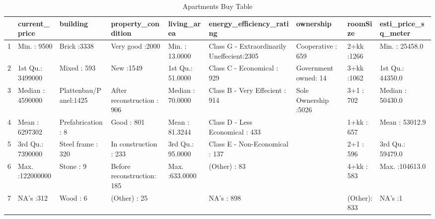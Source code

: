 \begin{table}[ht]
\centering
\begin{tabular}{rllllllll}
  \hline
 & current\_price &             building &             property\_condition &  living\_area &                          energy\_efficiency\_rating &            ownership &    roomSize & esti\_price\_sq\_meter \\ 
  \hline
1 & Min.   :     9500   & Brick           :3338   & Very good            :2000   & Min.   : 13.0000   & Class G - Extraordinarily Uneffecient:2305   & Cooperative     : 659   & 2+kk   :1266   & Min.   : 25458.0   \\ 
  2 & 1st Qu.:  3499000   & Mixed           : 593   & New                  :1549   & 1st Qu.: 51.0000   & Class C - Economical                 : 929   & Government owned:  14   & 3+kk   :1062   & 1st Qu.: 44350.0   \\ 
  3 & Median :  4590000   & Plattenbau/Panel:1425   & After reconstruction : 906   & Median : 70.0000   & Class B - Very Effecient             : 914   & Sole Ownership  :5026   & 3+1    : 702   & Median : 50430.0   \\ 
  4 & Mean   :  6297302   & Prefabrication  :   8   & Good                 : 801   & Mean   : 81.3244   & Class D - Less Economical            : 433   &  & 1+kk   : 657   & Mean   : 53012.9   \\ 
  5 & 3rd Qu.:  7390000   & Steel frame     : 320   & In construction      : 233   & 3rd Qu.: 95.0000   & Class E - Non-Economical             : 137   &  & 2+1    : 596   & 3rd Qu.: 59479.0   \\ 
  6 & Max.   :122000000   & Stone           :   9   & Before reconstruction: 185   & Max.   :633.0000   & (Other)                              :  83   &  & 4+kk   : 583   & Max.   :104613.0   \\ 
  7 & NA's   :312   & Wood            :   6   & (Other)              :  25   &  & NA's                                 : 898   &  & (Other): 833   & NA's   :1   \\ 
   \hline
\end{tabular}
\caption{Apartments Buy Table} 
\label{tab:one}
\end{table}

